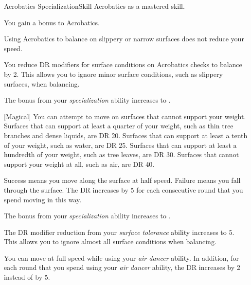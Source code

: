     \begin{feat}{Acrobatics Specialization}{Skill}
        \featpre Acrobatics as a mastered skill.

         You gain a  bonus to Acrobatics.

         Using Acrobatics to balance on slippery or narrow surfaces does not reduce your speed.

         You reduce DR modifiers for surface conditions on Acrobatics checks to balance by 2.
        This allows you to ignore minor surface conditions, such as slippery surfaces, when balancing.

         The bonus from your \textit{specialization} ability increases to .

        [Magical] You can attempt to move on surfaces that cannot support your weight.
        Surfaces that can support at least a quarter of your weight, such as thin tree branches and dense liquids, are DR 20.
        Surfaces that can support at least a tenth of your weight, such as water, are DR 25.
        Surfaces that can support at least a hundredth of your weight, such as tree leaves, are DR 30.
        Surfaces that cannot support your weight at all, such as air, are DR 40.

        Success means you move along the surface at half speed.
        Failure means you fall through the surface.
        The DR increases by 5 for each consecutive round that you spend moving in this way.

         The bonus from your \textit{specialization} ability increases to .

         The DR modifier reduction from your \textit{surface tolerance} ability increases to 5.
        This allows you to ignore almost all surface conditions when balancing.

         You can move at full speed while using your \textit{air dancer} ability.
        In addition, for each round that you spend using your \textit{air dancer} ability, the DR increases by 2 instead of by 5.
    \end{feat}

